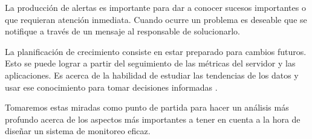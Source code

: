 La producción de alertas es importante para dar a conocer sucesos importantes o
que requieran atención inmediata. Cuando ocurre un problema es deseable que se
notifique a través de un mensaje al responsable de solucionarlo.

La planificación de crecimiento consiste en estar preparado para cambios
futuros. Esto se puede lograr a partir del seguimiento de las métricas del
servidor y las aplicaciones. Es acerca de la habilidad de estudiar las
tendencias de los datos y usar ese conocimiento para tomar decisiones
informadas \cite[p.~15]{monitoreo:monitoring_with_grapfite}.

Tomaremos estas miradas como punto de partida para hacer un análisis más
profundo acerca de los aspectos más importantes a tener en cuenta a la hora de
diseñar un sistema de monitoreo eficaz.

